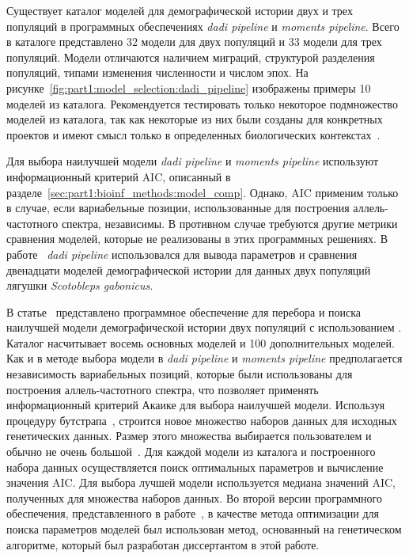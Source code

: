 Существует каталог моделей для демографической истории двух и трех популяций в программных обеспечениях \textit{dadi pipeline} и \textit{moments pipeline}.
Всего в каталоге представлено 32 модели для двух популяций и 33 модели для трех популяций.
Модели отличаются наличием миграций, структурой разделения популяций, типами изменения численности и числом эпох.
На рисунке~\ref{fig:part1:model_selection:dadi_pipeline} изображены примеры 10 моделей из каталога.
Рекомендуется тестировать только некоторое подмножество моделей из каталога, так как некоторые из них были созданы для конкретных проектов и имеют смысл только в определенных биологических контекстах~\cite{portik2017evaluating}.

Для выбора наилучшей модели \textit{dadi pipeline} и \textit{moments pipeline} используют информационный критерий $\text{AIC}$, описанный в разделе~\ref{sec:part1:bioinf_methods:model_comp}.
Однако, $\text{AIC}$ применим только в случае, если вариабельные позиции, использованные для построения аллель-частотного спектра, независимы.
В противном случае требуются другие метрики сравнения моделей, которые не реализованы в этих программных решениях.
В работе~\cite{portik2017evaluating} \textit{dadi pipeline} использовался для вывода параметров и сравнения двенадцати моделей демографической истории для данных двух популяций лягушки \textit{Scotobleps gabonicus}.

В статье~\cite{rippe2021environmental} представлено программное обеспечение для перебора и поиска наилучшей модели демографической истории двух популяций с использованием \moments.
Каталог насчитывает восемь основных моделей и 100 дополнительных моделей.
Как и в методе выбора модели в \textit{dadi pipeline} и \textit{moments pipeline} предполагается независимость вариабельных позиций, которые были использованы для построения аллель-частотного спектра, что позволяет применять информационный критерий Акаике для выбора наилучшей модели.
Используя процедуру бутстрапа~\cite{horowitz2001bootstrap}, строится новое множество наборов данных для исходных генетических данных.
Размер этого множества выбирается пользователем и обычно не очень большой~\cite{rippe2021environmental}.
Для каждой модели из каталога и построенного набора данных осуществляется поиск оптимальных параметров и вычисление значения $\text{AIC}$.
Для выбора лучшей модели используется медиана значений $\text{AIC}$, полученных для множества наборов данных.
Во второй версии программного обеспечения, представленного в работе~\cite{rippe2021environmental}, в качестве метода оптимизации для поиска параметров моделей был использован метод, основанный на генетическом алгоритме, который был разработан диссертантом в этой работе.

